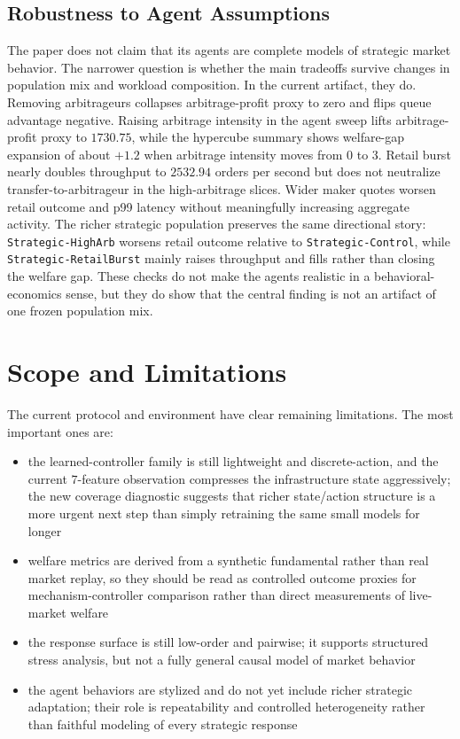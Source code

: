 \documentclass[11pt]{article}
\begin{document}
\subsection{Robustness to Agent Assumptions}
The paper does not claim that its agents are complete models of strategic market behavior. The narrower question is whether the main tradeoffs survive changes in population mix and workload composition. In the current artifact, they do. Removing arbitrageurs collapses arbitrage-profit proxy to zero and flips queue advantage negative. Raising arbitrage intensity in the agent sweep lifts arbitrage-profit proxy to $1730.75$, while the hypercube summary shows welfare-gap expansion of about $+1.2$ when arbitrage intensity moves from $0$ to $3$. Retail burst nearly doubles throughput to $2532.94$ orders per second but does not neutralize transfer-to-arbitrageur in the high-arbitrage slices. Wider maker quotes worsen retail outcome and p99 latency without meaningfully increasing aggregate activity. The richer strategic population preserves the same directional story: \texttt{Strategic-HighArb} worsens retail outcome relative to \texttt{Strategic-Control}, while \texttt{Strategic-RetailBurst} mainly raises throughput and fills rather than closing the welfare gap. These checks do not make the agents realistic in a behavioral-economics sense, but they do show that the central finding is not an artifact of one frozen population mix.

\section{Scope and Limitations}
The current protocol and environment have clear remaining limitations. The most important ones are:
\begin{itemize}[leftmargin=*]
  \item the learned-controller family is still lightweight and discrete-action, and the current $7$-feature observation compresses the infrastructure state aggressively; the new coverage diagnostic suggests that richer state/action structure is a more urgent next step than simply retraining the same small models for longer
  \item welfare metrics are derived from a synthetic fundamental rather than real market replay, so they should be read as controlled outcome proxies for mechanism-controller comparison rather than direct measurements of live-market welfare
  \item the response surface is still low-order and pairwise; it supports structured stress analysis, but not a fully general causal model of market behavior
  \item the agent behaviors are stylized and do not yet include richer strategic adaptation; their role is repeatability and controlled heterogeneity rather than faithful modeling of every strategic response
\end{itemize}
\end{document}
